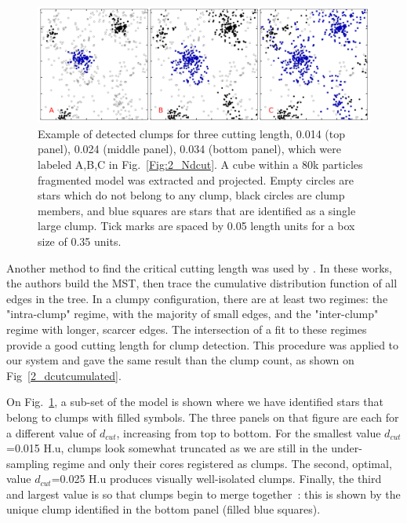  

 


\begin{figure}[h]
\begin{center}
\includegraphics[width=\columnwidth]{Figures/2_clumpsABC.png}
\end{center}
\caption{Example of detected clumps for three cutting length, 0.014 (top panel), 0.024 (middle panel), 0.034 (bottom panel), which were labeled A,B,C  in Fig.~\ref{Fig:2_Ndcut}. A cube within a 80k particles fragmented model was extracted and projected.  Empty circles are stars which do not belong to any clump, black circles are clump members, and blue squares are stars that are identified as a single large  clump. Tick marks are spaced by 0.05 length units for a box size of 0.35 units.}
\label{Fig:2_clumpsABC}
\end{figure} 




Another method to find the critical cutting length was used by \cite{Gutermuth2009,Kirk2011}. In these works, the authors build the MST, then trace the cumulative distribution function of all edges in the tree. In a clumpy configuration, there are at least two regimes: the "intra-clump" regime, with the majority of small edges, and the "inter-clump" regime with longer, scarcer edges. The intersection of a fit to these regimes provide a good cutting length for clump detection. This procedure was applied to our system and gave the same result than the clump count, as shown on Fig~\ref{2_dcutcumulated}.

 
   On Fig.~\ref{Fig:2_clumpsABC}, a sub-set of the model is shown where we have identified stars that belong to clumps with filled symbols. The three panels on that figure are each for a different value of $d_{cut}$, increasing from top to bottom. For the smallest value $d_{cut}$=0.015 H.u, clumps look somewhat truncated as we are still in the under-sampling regime and only their cores registered as clumps. The second, optimal, value $d_{cut}$=0.025 H.u produces visually well-isolated clumps. Finally, the third and  largest value is so that clumps begin to merge together~: this is shown by the unique clump identified in the bottom panel (filled blue squares).
   
